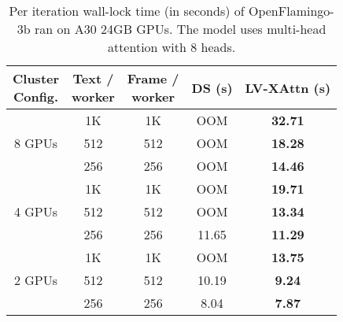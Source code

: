 \begin{table}[tb]
\centering
\caption{Per iteration wall-lock time (in seconds) of OpenFlamingo-3b ran on A30 24GB GPUs. The model uses multi-head attention with 8 heads.}
\begin{tabular}{|c|cc|c|c|} \hline
\makecell{Cluster\\Config.} & \makecell{Text /\\worker}& \makecell{Frame /\\worker} & DS (s) & LV-XAttn (s) \\ \hline
\multirow{3}{*}{8 GPUs} & 1K & 1K & OOM  & \textbf{32.71} \\ 
& 512 & 512 & OOM & \textbf{18.28} \\ 
& 256 & 256 & OOM & \textbf{14.46} \\ \hline
\multirow{3}{*}{4 GPUs}  & 1K & 1K & OOM & \textbf{19.71} \\ 
& 512 & 512 & OOM & \textbf{13.34} \\ 
& 256 & 256 & 11.65  & \textbf{11.29} \\ \hline
\multirow{3}{*}{2 GPUs}  & 1K & 1K & OOM & \textbf{13.75} \\ 
 & 512 & 512 & 10.19 & \textbf{9.24} \\ 
 & 256 & 256 & 8.04  & \textbf{7.87} \\
\hline
\end{tabular}
\label{tab:ds-flamingo}
\end{table}


